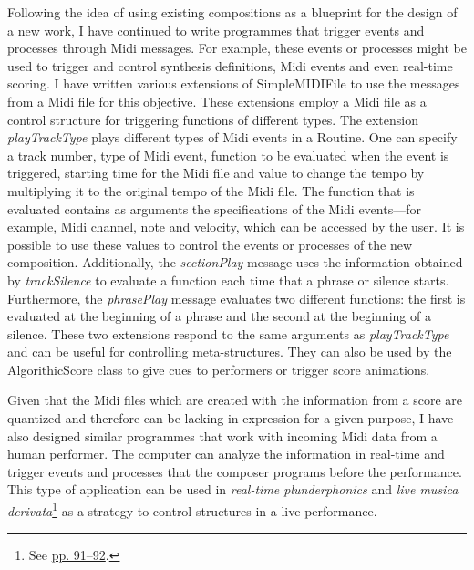 Following the idea of using existing compositions as a blueprint for the design of a new work, I have continued to write programmes that trigger events and processes through Midi messages. For example, these events or processes might be used to trigger and control synthesis definitions, Midi events and even real-time scoring. I have written various extensions of SimpleMIDIFile to use the messages from a Midi file for this objective. These extensions employ a Midi file as a control structure for triggering functions of different types.
The extension \emph{playTrackType} plays different types of Midi events in a Routine. One can specify a track number, type of Midi event, function to be evaluated when the event is triggered, starting time for the Midi file and  value to change the tempo by multiplying it to the original tempo of the Midi file. The function that is evaluated contains as arguments the specifications of the Midi events---for example, Midi channel, note and velocity, which can be accessed by the user. It is possible to use these values to control the events or processes of the new composition. Additionally, the \emph{sectionPlay} message uses the information obtained by \emph{trackSilence} to evaluate a function each time that a phrase or silence starts. Furthermore, the \emph{phrasePlay} message evaluates two different functions: the first is evaluated at the beginning of a phrase and the second at the beginning of a silence. These two extensions respond to the same arguments as \emph{playTrackType} and can be useful for controlling meta-structures. They can also be used by the AlgorithicScore class to give cues to performers or trigger score animations. 
\hypertarget{miditrig}{}

Given that the Midi files which are created with the information from a score are quantized and therefore can be lacking in expression for a given purpose, I have also designed similar programmes that work with incoming Midi data from a human performer. The computer can analyze the information in real-time and trigger events and processes that the composer programs before the performance. This type of application can be used in \emph{real-time plunderphonics} and \emph{live musica derivata}\footnote{See \hyperlink{realtimeplunderfuck}{pp. 91--92}.} as a strategy to control structures in a live performance.

\indent

